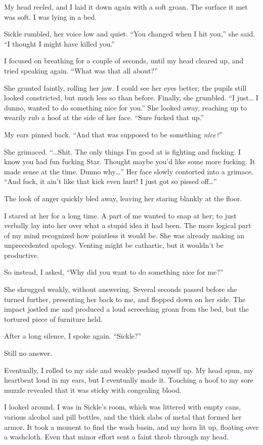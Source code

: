 My head reeled, and I laid it down again with a soft groan. The surface it met was soft. I was lying in a bed.

Sickle rumbled, her voice low and quiet. “You changed when I hit you,” she said. “I thought I might have killed you.”

I focused on breathing for a couple of seconds, until my head cleared up, and tried speaking again. “What was that all about?”

She grunted faintly, rolling her jaw. I could see her eyes better; the pupils still looked constricted, but much less so than before. Finally, she grumbled. “I just… I dunno, wanted to do something nice for you.” She looked away, reaching up to wearily rub a hoof at the side of her face. “Sure fucked that up.”

My ears pinned back. “And that was supposed to be something \textit{nice?}”

She grimaced. “...Shit. The only things I’m good at is fighting and fucking. I know you had fun fucking Star. Thought maybe you’d like some more fucking. It made sense at the time. Dunno why…” Her face slowly contorted into a grimace. “And fuck, it ain’t like that kick even hurt! I just got so pissed off…”

The look of anger quickly bled away, leaving her staring blankly at the floor.

I stared at her for a long time. A part of me wanted to snap at her; to just verbally lay into her over what a stupid idea it had been. The more logical part of my mind recognized how pointless it would be. She was already making an unprecedented apology. Venting might be cathartic, but it wouldn’t be productive.

So instead, I asked, “Why did you want to do something nice for me?”

She shrugged weakly, without answering. Several seconds passed before she turned further, presenting her back to me, and flopped down on her side. The impact jostled me and produced a loud screeching groan from the bed, but the tortured piece of furniture held.

After a long silence, I spoke again. “Sickle?”

Still no answer.

Eventually, I rolled to my side and weakly pushed myself up. My head spun, my heartbeat loud in my ears, but I eventually made it. Touching a hoof to my sore muzzle revealed that it was sticky with congealing blood.

I looked around. I was in Sickle’s room, which was littered with empty cans, various alcohol and pill bottles, and the thick slabs of metal that formed her armor. It took a moment to find the wash basin, and my horn lit up, floating over a washcloth. Even that minor effort sent a faint throb through my head.

